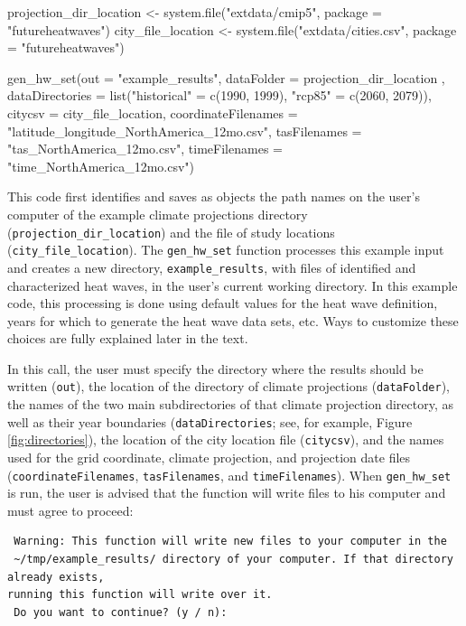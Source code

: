 \begin{Schunk}
\begin{Sinput}
projection_dir_location <- system.file("extdata/cmip5",
                                       package = "futureheatwaves")
city_file_location <- system.file("extdata/cities.csv",
                                  package = "futureheatwaves")

gen_hw_set(out = "example_results",
           dataFolder = projection_dir_location ,
           dataDirectories = list("historical" = c(1990, 1999),
                                        "rcp85" = c(2060, 2079)),
           citycsv = city_file_location,
           coordinateFilenames = "latitude_longitude_NorthAmerica_12mo.csv",
           tasFilenames = "tas_NorthAmerica_12mo.csv",
           timeFilenames = "time_NorthAmerica_12mo.csv")
\end{Sinput}
\end{Schunk}

This code first identifies and saves as objects the path names on the
user's computer of the example climate projections directory
(\texttt{projection\_dir\_location}) and the file of study locations
(\texttt{city\_file\_location}). The \texttt{gen\_hw\_set} function
processes this example input and creates a new directory,
\texttt{example\_results}, with files of identified and characterized
heat waves, in the user's current working directory. In this example
code, this processing is done using default values for the heat wave
definition, years for which to generate the heat wave data sets, etc.
Ways to customize these choices are fully explained later in the text.

In this call, the user must specify the directory where the results
should be written (\texttt{out}), the location of the directory of
climate projections (\texttt{dataFolder}), the names of the two main
subdirectories of that climate projection directory, as well as their
year boundaries (\texttt{dataDirectories}; see, for example, Figure
\ref{fig:directories}), the location of the city location file
(\texttt{citycsv}), and the names used for the grid coordinate, climate
projection, and projection date files (\texttt{coordinateFilenames},
\texttt{tasFilenames}, and \texttt{timeFilenames}). When
\texttt{gen\_hw\_set} is run, the user is advised that the function will
write files to his computer and must agree to proceed:

\begin{verbatim}
 Warning: This function will write new files to your computer in the 
 ~/tmp/example_results/ directory of your computer. If that directory already exists,
running this function will write over it. 
 Do you want to continue? (y / n): 
\end{verbatim}

